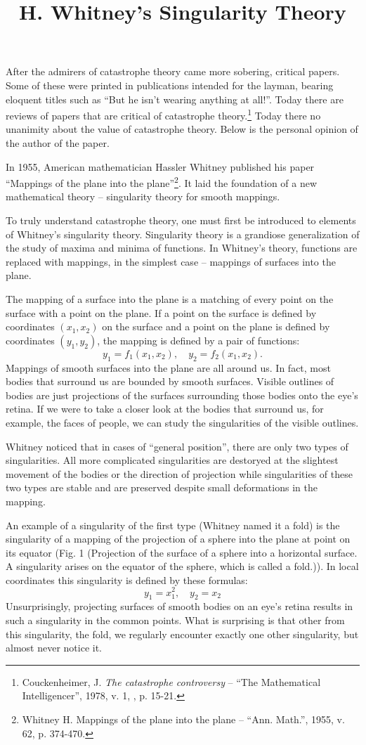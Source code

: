 \documentclass[12pt]{amsart}
\begin{document}
After the admirers of catastrophe theory came more sobering, critical papers.
Some of these were printed in publications intended for the layman, bearing
eloquent titles such as ``But he isn't wearing anything at all!''.
Today there are reviews of papers that are critical of catastrophe
theory.\footnote{Couckenheimer, J. \textit{The catastrophe controversy} -- ``The
Mathematical Intelligencer'', 1978, v. 1, , p. 15-21.}
Today there no unanimity about the value of catastrophe theory.
Below is the personal opinion of the author of the paper.\\

\title{H. Whitney's Singularity Theory}

In 1955, American mathematician Hassler Whitney published his paper ``Mappings
of the plane into the plane''\footnote{Whitney H. Mappings of the plane into the
plane -- ``Ann. Math.'', 1955, v. 62, p. 374-470.}.
It laid the foundation of a new mathematical theory -- singularity theory for
smooth mappings.

To truly understand catastrophe theory, one must first be introduced to elements
of Whitney's singularity theory.
Singularity theory is a grandiose generalization of the study of maxima and
minima of functions.
In Whitney's theory, functions are replaced with mappings, in the simplest case
-- mappings of surfaces into the plane.

The mapping of a surface into the plane is a matching of every point on the
surface with a point on the plane.
If a point on the surface is defined by coordinates $(x_1,x_2)$ on the surface
and a point on the plane is defined by coordinates $(y_1,y_2)$, the mapping is
defined by a pair of functions:
$$y_1=f_1(x_1,x_2),\quad y_2=f_2(x_1,x_2).$$
Mappings of smooth surfaces into the plane are all around us.
In fact, most bodies that surround us are bounded by smooth surfaces.
Visible outlines of bodies are just projections of the surfaces surrounding
those bodies onto the eye's retina.
If we were to take a closer look at the bodies that surround us, for example,
the faces of people, we can study the singularities of the visible outlines.

Whitney noticed that in cases of ``general position'', there are only two types
of singularities.
All more complicated singularities are destoryed at the slightest movement of
the bodies or the direction of projection while singularities of these two types
are stable and are preserved despite small deformations in the mapping.

An example of a singularity of the first type (Whitney named it a fold) is the
singularity of a mapping of the projection of a sphere into the plane at point
on its equator (Fig. 1 (Projection of the surface of a sphere into a horizontal
surface.
A singularity arises on the equator of the sphere, which is called a fold.)).
In local coordinates this singularity is defined by these formulas:
$$y_1=x_1^2,\quad y_2=x_2$$
Unsurprisingly, projecting surfaces of smooth bodies on an eye's retina results
in such a singularity in the common points.
What is surprising is that other from this singularity, the fold, we regularly
encounter exactly one other singularity, but almost never notice it.
\end{document}
